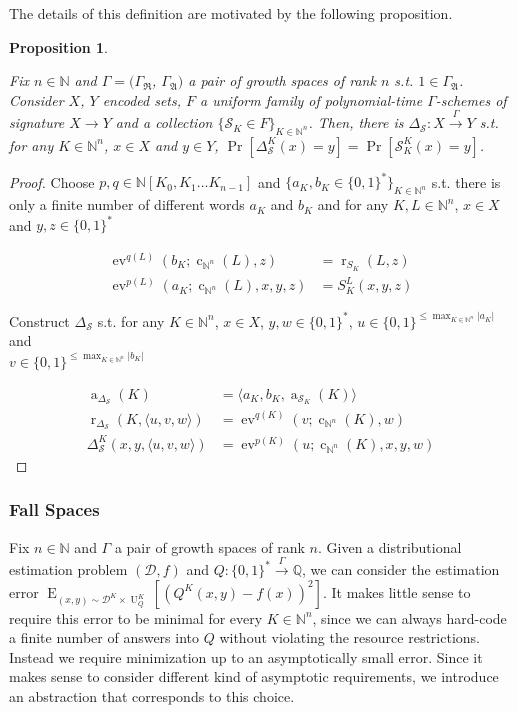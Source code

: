 \documentclass{article}
\numberwithin{equation}{section}
\theoremstyle{definition}
\theoremstyle{plain}
\newtheorem{proposition}{Proposition}[section]
\newcommand{\Bool}{\{0,1\}}
\newcommand{\Words}{{\Bool^*}}
\DeclareMathOperator{\E}{E}
\DeclareMathOperator{\Ev}{ev}
\DeclareMathOperator{\R}{r}
\DeclareMathOperator{\A}{a}
\DeclareMathOperator{\Un}{U}
\DeclareMathOperator{\En}{c}
\newcommand{\Nats}{\mathbb{N}}
\newcommand{\Rats}{\mathbb{Q}}
\newcommand{\NatPoly}{\Nats[K_0, K_1 \ldots K_{n-1}]}
\newcommand{\Abs}[1]{\lvert #1 \rvert}
\newcommand{\Chev}[1]{\langle #1 \rangle}
\newcommand{\Dist}{\mathcal{D}}
\newcommand{\GrowR}{\Gamma_{\mathfrak{R}}}
\newcommand{\GrowA}{\Gamma_{\mathfrak{A}}}
\newcommand{\Scheme}{\xrightarrow{\Gamma}}
\begin{document}
The details of this definition are motivated by the following proposition.

\begin{proposition}
\label{prp:fam_diag}

Fix $n \in \Nats$ and $\Gamma=(\GrowR$, $\GrowA)$ a pair of growth spaces of rank $n$ s.t. $1 \in \GrowA$. Consider $X$, $Y$ encoded sets, $F$ a uniform family of polynomial-time $\Gamma$-schemes of signature $X \rightarrow Y$ and a collection ${\{\mathcal{S}_K \in F\}_{K \in \Nats^n}}$. Then, there is $\Delta_\mathcal{S}: X \xrightarrow{
\Gamma} Y$ s.t. for any $K \in \Nats^n$, $x \in X$ and $y \in Y$, ${\Pr[\Delta_\mathcal{S}^K(x)=y] = \Pr[\mathcal{S}_K^K(x)=y]}$.

\end{proposition}

\begin{proof}

Choose ${p,q \in \NatPoly}$ and ${\{a_K, b_K \in \Words\}}_{K \in \Nats^n}$ s.t. there is only a finite number of different words ${a_K}$ and ${b_K}$ and for any ${K,L \in \Nats^n}$, ${x \in X}$ and ${y,z \in \Words}$

\begin{align*}
\Ev^{q(L)}(b_K;\En_{\Nats^n}(L),z) &= \R_{S_K}(L,z) \\
\Ev^{p(L)}(a_K;\En_{\Nats^n}(L),x,y,z) &= S_K^L(x,y,z) 
\end{align*}

Construct ${\Delta_{\mathcal{S}}}$ s.t. for any ${K \in \Nats^n}$, ${x \in X}$, ${y, w \in \Words}$, ${u \in \Bool^{\leq \max_{K \in \Nats^n} \Abs{a_K}}}$ and\\ ${v \in \Bool^{\leq \max_{K \in \Nats^n} \Abs{b_K}}}$

\begin{align*}
\A_{\Delta_{\mathcal{S}}}(K)&=\Chev{a_K,b_K,\A_{\mathcal{S}_K}(K)} \\
\R_{\Delta_{\mathcal{S}}}(K,\Chev{u,v,w})&=\Ev^{q(K)}(v;\En_{\Nats^n}(K),w) \\
\Delta_{\mathcal{S}}^K(x,y,\Chev{u,v,w})&=\Ev^{p(K)}(u;\En_{\Nats^n}(K),x,y,w)
\end{align*}
%
\end{proof}

\subsubsection{Fall Spaces}

Fix $n \in \Nats$ and $\Gamma$ a pair of growth spaces of rank $n$. Given a distributional estimation problem $(\Dist,f)$ and $Q: \Words \Scheme \Rats$, we can consider the estimation error $\E_{(x,y) \sim \Dist^{K} \times \Un_Q^K}[(Q^K(x,y) - f(x))^2]$. It makes little sense to require this error to be minimal for every $K \in \Nats^n$, since we can always hard-code a finite number of answers into $Q$ without violating the resource restrictions. Instead we require minimization up to an asymptotically small error. Since it makes sense to consider different kind of asymptotic requirements, we introduce an abstraction that corresponds to this choice.
\end{document}
